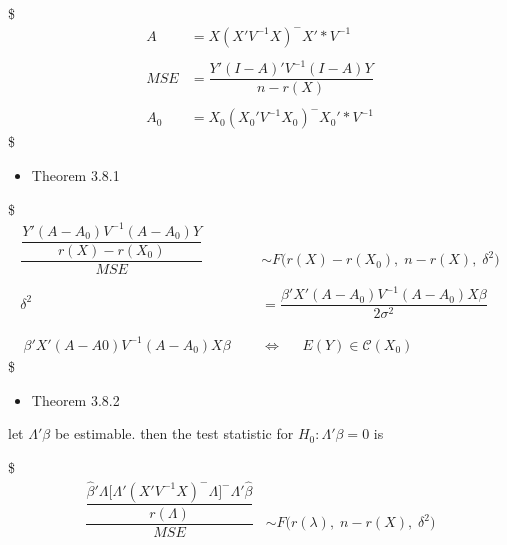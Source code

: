 \documentclass[
]{book}
\providecommand{\tightlist}{%
  \setlength{\itemsep}{0pt}\setlength{\parskip}{0pt}}
\begin{document}
{{{\$
\begin{align}


A &= X(X'V^{-1}X)^- X' \ast V^{-1}

\\
\\

MSE &= \dfrac{Y' (I-A)' V^{-1} (I-A)Y}{n-r(X)}

\\
\\

A_0 &= X_0(X_0'V^{-1}X_0)^- X_0' \ast V^{-1}

\end{align}
\$

\begin{itemize}
\tightlist
\item
  Theorem 3.8.1
\end{itemize}

\$
\begin{align}

\dfrac{\dfrac{Y' (A-A_0) V^{-1} (A-A_0)Y}{r(X) - r(X_0 )}}{MSE} &\sim F \Big( r(X)-r(X_0), \; n-r(X) , \; \delta^2 \Big)

\\
\\

\delta^2 &= \dfrac{\beta ' X' (A-A_0) V^{-1} (A-A_0)X \beta}{2\sigma^2} \tag{1}


\\

\\

\\\


{\beta ' X' (A-A0) V^{-1} (A-A_0)X \beta} \; \; \; \; \; &\iff \; \; \; \; \; E(Y) \in \mathcal{C}(X_0) \tag{2}


\end{align}
\$

\begin{itemize}
\tightlist
\item
  Theorem 3.8.2
\end{itemize}

let \(\Lambda ' \beta\) be estimable. then the test statistic for \(H_0 : \Lambda ' \beta = 0\) is

\$
\begin{align}




\dfrac{\dfrac{\hat \beta ' \Lambda \Big[ \Lambda ' (X'V^{-1}X)^- \Lambda \Big]^- \Lambda ' \hat \beta}{r(\Lambda)}}{MSE} &\sim F \Big( r(\lambda), \; n-r(X) , \; \delta^2 \Big)


\end{align}}}}
\end{document}
